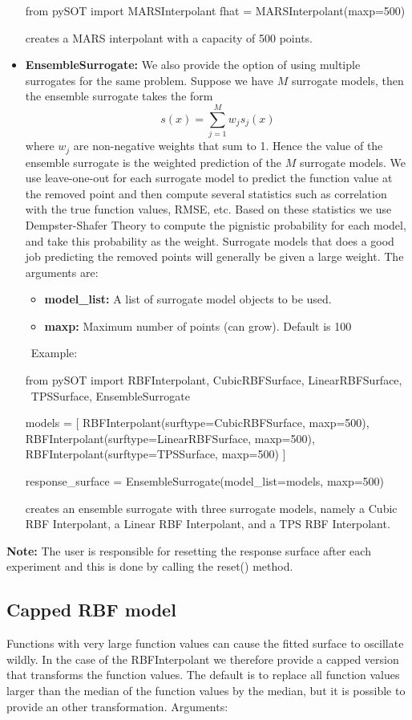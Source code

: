 \documentclass[]{article}
\begin{document}
\begin{itemize}
\begin{python}
from pySOT import MARSInterpolant
fhat = MARSInterpolant(maxp=500)
\end{python}
creates a MARS interpolant with a capacity of 500 points.
\item \textbf{EnsembleSurrogate:} We also provide the option of using multiple surrogates 
for the same problem. Suppose we have $M$ surrogate models, then the ensemble 
surrogate takes the form
\begin{equation*}
s(x) = \sum_{j=1}^M w_j s_j(x)
\end{equation*}
where $w_j$ are non-negative weights that sum to 1. Hence the value of the ensemble 
surrogate is the weighted prediction of the $M$ surrogate models. We use leave-one-out 
for each surrogate model to predict the function value at the removed point and then 
compute several statistics such as correlation with the true function values, RMSE, etc. 
Based on these statistics we use Dempster-Shafer Theory to compute the pignistic 
probability for each model, and take this probability as the weight. Surrogate models 
that does a good job predicting the removed points will generally be given a large 
weight. The arguments are:

\begin{itemize}
	\item \textbf{model\_list:} A list of surrogate model objects to be used.
	\item \textbf{maxp:} Maximum number of points (can grow). Default is 100
\end{itemize}
\ \newline Example: 

\begin{python}
from pySOT import RBFInterpolant, CubicRBFSurface, LinearRBFSurface, \ 
		  TPSSurface, EnsembleSurrogate

models = [
	RBFInterpolant(surftype=CubicRBFSurface, maxp=500),
	RBFInterpolant(surftype=LinearRBFSurface, maxp=500),
	RBFInterpolant(surftype=TPSSurface, maxp=500)
]

response_surface = EnsembleSurrogate(model_list=models, maxp=500)
\end{python}
creates an ensemble surrogate with three surrogate models, namely a 
Cubic RBF Interpolant, a Linear RBF Interpolant, and a TPS RBF Interpolant.
\end{itemize}
\textbf{Note:} The user is responsible for resetting the response surface after 
each experiment and this is done by calling the reset() method.

\subsection{Capped RBF model} Functions with very large function values can 
cause the fitted surface to oscillate wildly. In the case of the RBFInterpolant we 
therefore provide a capped version that transforms the function values. The 
default is to replace all function values larger than the median of the function 
values by the median, but it is possible to provide an other transformation. Arguments: \\
\end{document}
